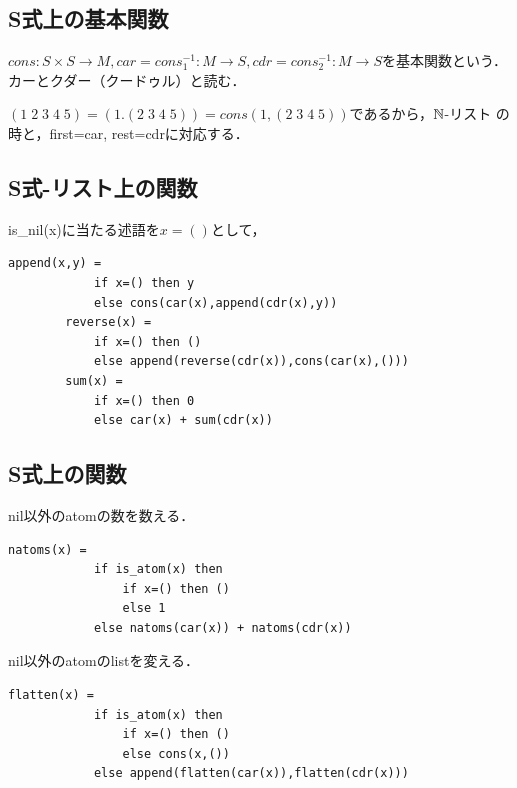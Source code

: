 \documentclass[uplatex, dvipdfmx]{jsreport}
\begin{document}
\subsection{S式上の基本関数}

\begin{definition}
    $cons:S\times S\to M, car=cons_1^{-1}:M\to S, cdr=cons_2^{-1}:M\to S$を基本関数という．カーとクダー（クードゥル）と読む．
\end{definition}
\begin{remark}
    $(1\;2\;3\;4\;5)=(1.(2\;3\;4\;5))=cons(1,(2\;3\;4\;5))$であるから，$\mathbb{N}$-リスト
    の時と，first=car, rest=cdrに対応する．
\end{remark}

\subsection{S式-リスト上の関数}

\begin{example}
    is\_nil(x)に当たる述語を$x=()$として，
    \begin{lstlisting}[caption=append]
        append(x,y) =
            if x=() then y
            else cons(car(x),append(cdr(x),y))
        reverse(x) =
            if x=() then ()
            else append(reverse(cdr(x)),cons(car(x),()))
        sum(x) =
            if x=() then 0
            else car(x) + sum(cdr(x))
    \end{lstlisting}
\end{example}

\subsection{S式上の関数}

\begin{example}[アトムの数]
    nil以外のatomの数を数える．
    \begin{lstlisting}[caption=natoms]
        natoms(x) =
            if is_atom(x) then
                if x=() then ()
                else 1
            else natoms(car(x)) + natoms(cdr(x))
    \end{lstlisting}
\end{example}

\begin{example}[flatten]
    nil以外のatomのlistを変える．
    \begin{lstlisting}[caption=flatten]
        flatten(x) =
            if is_atom(x) then
                if x=() then ()
                else cons(x,())
            else append(flatten(car(x)),flatten(cdr(x)))
    \end{lstlisting}
\end{example}
\end{document}
